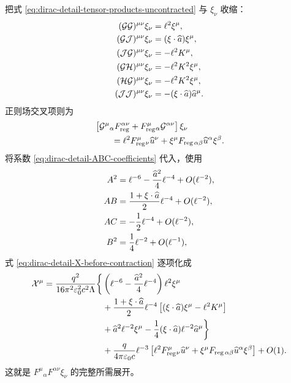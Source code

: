 把式 \eqref{eq:dirac-detail-tensor-products-uncontracted} 与 $\xi_\nu$ 收缩：
\begin{align}
 (\mathcal G\mathcal G)^{\mu\nu}\xi_\nu
 &=\ell^2\xi^\mu,
 \notag\\
 (\mathcal G\mathcal J)^{\mu\nu}\xi_\nu
 &=(\xi\cdot \widehat a)\xi^\mu,
 \notag\\
 (\mathcal J\mathcal G)^{\mu\nu}\xi_\nu
 &=-\ell^2K^\mu,
 \notag\\
 (\mathcal G\mathcal H)^{\mu\nu}\xi_\nu
 &=-\ell^2K^2\xi^\mu,
 \notag\\
 (\mathcal H\mathcal G)^{\mu\nu}\xi_\nu
 &=-\ell^2K^2\xi^\mu,
 \notag\\
 (\mathcal J\mathcal J)^{\mu\nu}\xi_\nu
 &=-(\xi\cdot \widehat a)\widehat a^\mu.
 \label{eq:dirac-detail-tensor-products-contracted}
\end{align}
正则场交叉项则为
\begin{align}
 &\left[
 \mathcal G^\mu{}_{\alpha}F_{\mathrm{reg}}^{\alpha\nu}
 +F_{\mathrm{reg}}^\mu{}_{\alpha}\mathcal G^{\alpha\nu}
 \right]\xi_\nu
 \notag\\
 &\qquad
 =\ell^2F_{\mathrm{reg}}^\mu{}_{\nu}\widehat u^\nu
 +\xi^\mu F_{\mathrm{reg}\,\alpha\beta}\widehat u^\alpha\xi^\beta.
 \label{eq:dirac-detail-regular-cross-contraction}
\end{align}
将系数 \eqref{eq:dirac-detail-ABC-coefficients} 代入，使用
\begin{align*}
 A^2&=\ell^{-6}-{\widehat a^2\over4}\ell^{-4}+O(\ell^{-2}),\\
 AB&={1+\xi\cdot \widehat a\over2}\ell^{-4}+O(\ell^{-2}),\\
 AC&=-{1\over2}\ell^{-4}+O(\ell^{-2}),\\
 B^2&={1\over4}\ell^{-2}+O(\ell^{-1}),
\end{align*}
式 \eqref{eq:dirac-detail-X-before-contraction} 逐项化成
\begin{align}
 \mathcal X^\mu
 ={q^2\over16\pi^2\varepsilon_0^2c^2\Lambda}
 \bigg\{{}
 &\left(\ell^{-6}-{\widehat a^2\over4}\ell^{-4}\right)
 \ell^2\xi^\mu
 \notag\\
 &+{1+\xi\cdot \widehat a\over2}\ell^{-4}
 \left[(\xi\cdot \widehat a)\xi^\mu-\ell^2K^\mu\right]
 \notag\\
 &+\widehat a^2\ell^{-2}\xi^\mu
 -{1\over4}(\xi\cdot \widehat a)\ell^{-2}\widehat a^\mu
 \bigg\}
 \notag\\
 &+{q\over4\pi\varepsilon_0c}\ell^{-3}
 \left[
 \ell^2F_{\mathrm{reg}}^\mu{}_{\nu}\widehat u^\nu
 +\xi^\mu F_{\mathrm{reg}\,\alpha\beta}\widehat u^\alpha\xi^\beta
 \right]+O(1).
 \label{eq:dirac-detail-X-expanded}
\end{align}
这就是 $F^\mu{}_{\alpha}F^{\alpha\nu}\xi_\nu$ 的完整所需展开。

